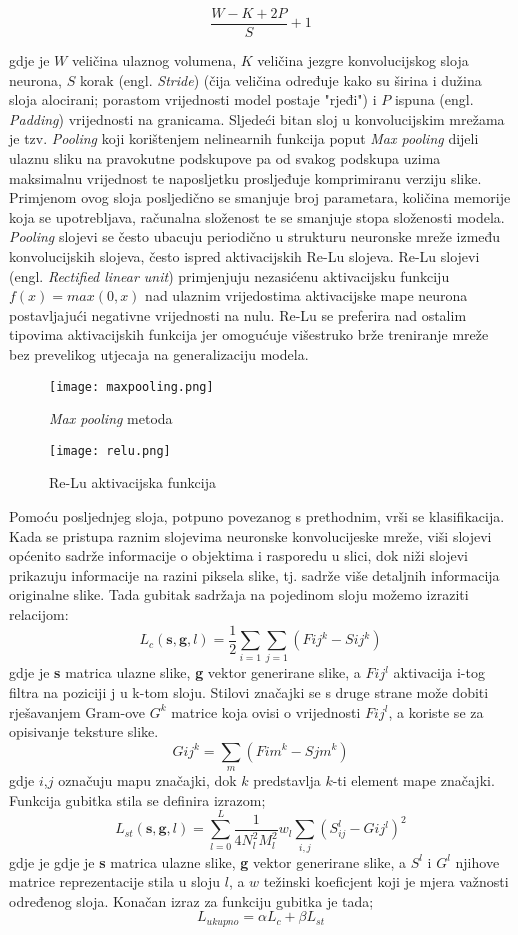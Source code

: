 \documentclass[times, utf8, diplomski]{fer}
\begin{document}
$$ \frac{W-K+2P}{S}+1 $$

gdje je $W$ veličina ulaznog volumena, $K$ veličina jezgre konvolucijskog sloja neurona, $S$ korak (engl. \textit{Stride}) (čija veličina određuje kako su širina i dužina sloja alocirani; porastom vrijednosti model postaje "rjeđi") i $P$ ispuna (engl. \textit{Padding}) vrijednosti na granicama. Sljedeći bitan sloj u konvolucijskim mrežama je tzv. \textit{Pooling} koji korištenjem nelinearnih funkcija poput \textit{Max pooling} dijeli ulaznu sliku na pravokutne podskupove pa od svakog podskupa uzima maksimalnu vrijednost te naposljetku prosljeđuje komprimiranu verziju slike. Primjenom ovog sloja posljedično se smanjuje broj parametara, količina memorije koja se upotrebljava, računalna složenost te se smanjuje stopa složenosti modela. \textit{Pooling} slojevi se često ubacuju periodično u strukturu neuronske mreže između konvolucijskih slojeva, često ispred aktivacijskih Re-Lu slojeva. Re-Lu slojevi (engl. \textit{Rectified linear unit}) primjenjuju nezasićenu aktivacijsku funkciju $ f(x) = max(0,x)$ nad ulaznim vrijedostima aktivacijske mape neurona postavljajući negativne vrijednosti na nulu. Re-Lu se preferira nad ostalim tipovima aktivacijskih funkcija jer omogućuje višestruko brže treniranje mreže bez prevelikog utjecaja na generalizaciju modela.\begin{figure}
\centering
\texttt{[image: maxpooling.png]}
		\caption{\textit{Max pooling} metoda }
		\label{fig:Re-Lu aktivacijska funkcija}
\end{figure}
\begin{figure}
\centering
\texttt{[image: relu.png]}
		\caption{Re-Lu aktivacijska funkcija }
		\label{fig:Re-Lu aktivacijska funkcija}
\end{figure}
Pomoću posljednjeg sloja, potpuno povezanog s prethodnim, vrši se klasifikacija. Kada se pristupa raznim slojevima neuronske konvolucijeske mreže, viši slojevi općenito sadrže informacije o objektima i rasporedu u slici, dok niži slojevi prikazuju informacije na razini piksela slike, tj. sadrže više detaljnih informacija originalne slike. Tada gubitak sadržaja na pojedinom sloju možemo izraziti relacijom:
$$ L_{c}(\textbf{s},\textbf{g},l) = \frac{1}{2} \sum_{i=1}\sum_{j=1}(F{ij}^k-S{ij}^k)$$
gdje je \textbf{s} matrica ulazne slike, \textbf{g} vektor generirane slike, a $F{ij}^l$ aktivacija i-tog filtra na poziciji j u k-tom sloju. Stilovi značajki se s druge strane može dobiti rješavanjem Gram-ove $ G^k$ matrice koja ovisi o vrijednosti $F{ij}^l$, a koriste se za opisivanje teksture slike.
$$ G{ij}^k = \sum_{m}(F{im}^k-S{jm}^k)$$
gdje $i$,$j$ označuju mapu značajki, dok $k$ predstavlja $k$-ti element mape značajki. Funkcija gubitka stila se definira izrazom;
$$ L_{st}(\textbf{s},\textbf{g},l) =\sum_{l=0}^L \frac{1}{4 N_l^2 M_l^2} w_l\sum_{i,j}(S_{ij}^l-G{ij}^l)^2 $$
gdje je gdje je \textbf{s} matrica ulazne slike, \textbf{g} vektor generirane slike, a $S^l$ i $G^l$ njihove matrice reprezentacije stila u sloju $l$, a $w$ težinski koeficjent koji je mjera važnosti određenog sloja. Konačan izraz za funkciju gubitka je tada;
$$ L_{ukupno} = \alpha L_{c} + \beta L_{st} $$
\end{document}
